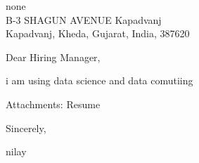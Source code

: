 \documentclass[11pt,a4paper]{letter}
\begin{document}
\begin{letter}{
none\\
B-3 SHAGUN AVENUE Kapadvanj\\
Kapadvanj, Kheda, Gujarat, India, 387620
}

\address{
nilay\\
B-3 SHAGUN AVENUE Kapadvanj\\
Kapadvanj, Kheda, Gujarat, India, 387620\\
9016989674\\
\href{mailto:nilaypatel@gmail.com}{nilaypatel@gmail.com}
}

\date{12/11/2024}

\opening{Dear Hiring Manager,}

i am using data science and data comutiing

\vspace{\baselineskip}
\noindent Attachments: Resume

\closing{Sincerely,}

nilay

\end{letter}
\end{document}
